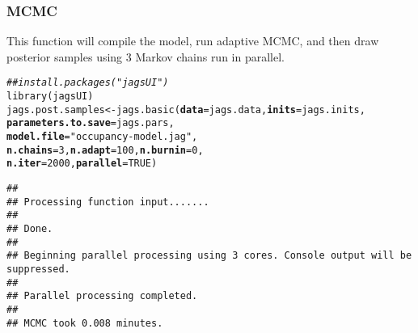 \documentclass[color=usenames,dvipsnames]{beamer}\usepackage[]{graphicx}\usepackage[]{color}
\makeatletter
\newcommand{\hlnum}[1]{\textcolor[rgb]{0.69,0.494,0}{#1}}%
\newcommand{\hlstr}[1]{\textcolor[rgb]{0.749,0.012,0.012}{#1}}%
\newcommand{\hlcom}[1]{\textcolor[rgb]{0.514,0.506,0.514}{\textit{#1}}}%
\newcommand{\hlstd}[1]{\textcolor[rgb]{0,0,0}{#1}}%
\newcommand{\hlkwb}[1]{\textcolor[rgb]{0,0.341,0.682}{#1}}%
\newcommand{\hlkwc}[1]{\textcolor[rgb]{0,0,0}{\textbf{#1}}}%
\newcommand{\hlkwd}[1]{\textcolor[rgb]{0.004,0.004,0.506}{#1}}%
\newenvironment{kframe}{%
 \def\at@end@of@kframe{}%
 \ifinner\ifhmode%
  \def\at@end@of@kframe{\end{minipage}}%
  \begin{minipage}{\columnwidth}%
 \fi\fi%
 \def\FrameCommand##1{\hskip\@totalleftmargin \hskip-\fboxsep
 \colorbox{shadecolor}{##1}\hskip-\fboxsep
     \hskip-\linewidth \hskip-\@totalleftmargin \hskip\columnwidth}%
 \MakeFramed {\advance\hsize-\width
   \@totalleftmargin\z@ \linewidth\hsize
   \@setminipage}}%
 {\par\unskip\endMakeFramed%
 \at@end@of@kframe}
\newenvironment{knitrout}{}{} %
\makeatother
\begin{document}
\begin{frame}[fragile]
  \frametitle{MCMC}
  \small
  This function will compile the model, run adaptive MCMC, and then
  draw posterior samples using 3 Markov chains run in parallel. \\
\begin{knitrout}\scriptsize
{}\color{fgcolor}\begin{kframe}
\begin{alltt}
\hlcom{## install.packages("jagsUI")}
\hlkwd{library}\hlstd{(jagsUI)}
\hlstd{jags.post.samples} \hlkwb{<-} \hlkwd{jags.basic}\hlstd{(}\hlkwc{data}\hlstd{=jags.data,} \hlkwc{inits}\hlstd{=jags.inits,}
                                \hlkwc{parameters.to.save}\hlstd{=jags.pars,}
                                \hlkwc{model.file}\hlstd{=}\hlstr{"occupancy-model.jag"}\hlstd{,}
                                \hlkwc{n.chains}\hlstd{=}\hlnum{3}\hlstd{,} \hlkwc{n.adapt}\hlstd{=}\hlnum{100}\hlstd{,} \hlkwc{n.burnin}\hlstd{=}\hlnum{0}\hlstd{,}
                                \hlkwc{n.iter}\hlstd{=}\hlnum{2000}\hlstd{,} \hlkwc{parallel}\hlstd{=}\hlnum{TRUE}\hlstd{)}
\end{alltt}
\begin{verbatim}
## 
## Processing function input....... 
## 
## Done. 
##  
## Beginning parallel processing using 3 cores. Console output will be suppressed.
## 
## Parallel processing completed.
## 
## MCMC took 0.008 minutes.
\end{verbatim}
\end{kframe}
\end{knitrout}
\end{frame}
\end{document}
